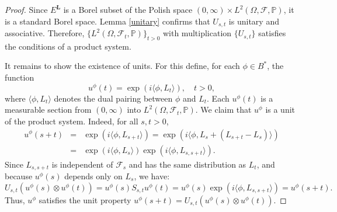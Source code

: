 \documentclass[11pt]{amsart}
\theoremstyle{definition}
\theoremstyle{remark}
\numberwithin{equation}{section}
\newcommand{\m}{\mathcal }
\begin{document}
\begin{proof}
Since  \(E^{\bm{L}}\) is a Borel subset of the Polish space \( (0,\infty)\times L^2(\Omega, \m{F}, \mathbb{P})\), it is a standard Borel space.
Lemma \ref{unitary} confirms that \( U_{s,t} \) is unitary and associative. Therefore, \( \{ L^2(\Omega, \mathcal{F}_t, \mathbb{P}) \}_{t > 0} \) with multiplication \( \{ U_{s,t} \} \) satisfies the conditions of a product system.

It remains to show the existence of units. For this define, for each \( \phi \in B^* \), the function
\[
u^\phi(t) = \exp(i \langle \phi, L_t \rangle), \quad t > 0,
\] where \( \langle \phi, L_t \rangle \) denotes the dual pairing between \( \phi \) and \( L_t \).
Each \( u^\phi (t)\) is a measurable section from \( (0, \infty) \) into \( L^2(\Omega, \mathcal{F}_t, \mathbb{P}) \). We claim that \( u^\phi \) is a unit of the product system. Indeed, for all \( s, t > 0 \),
\begin{eqnarray*}
u^\phi(s + t) &=& \exp(i \langle \phi, L_{s + t} \rangle) = \exp(i \langle \phi, L_s + (L_{s + t} - L_s) \rangle) \\&=& \exp(i \langle \phi, L_s \rangle) \exp(i \langle \phi, L_{s, s + t} \rangle).
\end{eqnarray*}
Since \( L_{s, s + t} \) is independent of \( \mathcal{F}_s \) and has the same distribution as \( L_t \), and because \( u^\phi(s) \) depends only on \( L_s \), we have:
\[
U_{s,t}(u^\phi(s) \otimes u^\phi(t)) = u^\phi(s) S_{s,t} u^\phi(t) = u^\phi(s) \exp(i \langle \phi, L_{s, s + t} \rangle) = u^\phi(s + t).
\]
Thus, \( u^\phi \) satisfies the unit property \( u^\phi(s + t) = U_{s,t}(u^\phi(s) \otimes u^\phi(t)) \).\end{proof}
\end{document}

